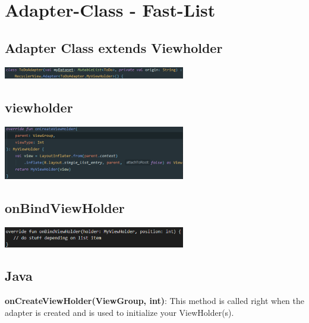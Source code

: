 \documentclass{report}
\newenvironment{Figure}
	{\par\medskip\noindent\minipage{\linewidth}}
	{\endminipage\par\medskip}
\theoremstyle{definition}
\theoremstyle{example}
\begin{document}
\section{Adapter-Class - Fast-List}

\subsection{Adapter Class extends Viewholder}
\begin{Figure}
   \centering
    \includegraphics[width=300px]{img/adapterClass.png}
        \label{fig:Code Snippet implement adapter class}
\end{Figure}

\subsection{viewholder}
\begin{Figure}
   \centering
    \includegraphics[width=300px]{img/viewholder.png}
        \label{fig:Code Snippet creating a viewholder}
\end{Figure}

\subsection{onBindViewHolder}
\begin{Figure}
   \centering
    \includegraphics[width=300px]{img/onBindViewHolder.png}
        \label{fig:Code Snippet onBindViewHolder is specific to app, problem, list entry}
\end{Figure}

\subsection{Java}
\textbf{onCreateViewHolder(ViewGroup, int)}: This method is called right when the adapter is created and is used to initialize your ViewHolder(s).\\
\end{document}
